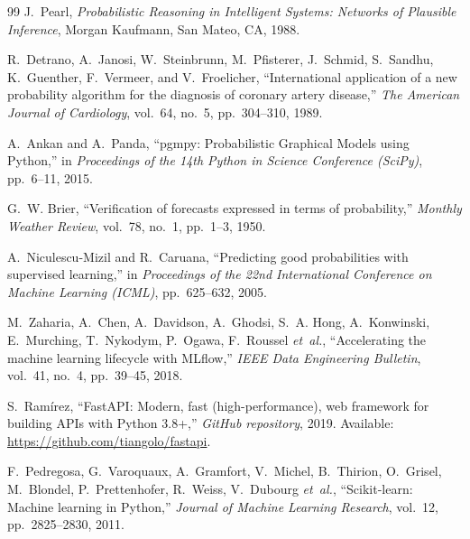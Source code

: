 \documentclass[12pt,a4paper]{report}
\begin{document}
\begin{thebibliography}{99}
J.~Pearl, \emph{Probabilistic Reasoning in Intelligent Systems: Networks of Plausible Inference}, Morgan Kaufmann, San Mateo, CA, 1988.

R.~Detrano, A.~Janosi, W.~Steinbrunn, M.~Pfisterer, J.~Schmid, S.~Sandhu, K.~Guenther, F.~Vermeer, and V.~Froelicher, ``International application of a new probability algorithm for the diagnosis of coronary artery disease,'' \emph{The American Journal of Cardiology}, vol.~64, no.~5, pp.~304--310, 1989.

A.~Ankan and A.~Panda, ``pgmpy: Probabilistic Graphical Models using Python,'' in \emph{Proceedings of the 14th Python in Science Conference (SciPy)}, pp.~6--11, 2015.

G.~W. Brier, ``Verification of forecasts expressed in terms of probability,'' \emph{Monthly Weather Review}, vol.~78, no.~1, pp.~1--3, 1950.

A.~Niculescu-Mizil and R.~Caruana, ``Predicting good probabilities with supervised learning,'' in \emph{Proceedings of the 22nd International Conference on Machine Learning (ICML)}, pp.~625--632, 2005.

M.~Zaharia, A.~Chen, A.~Davidson, A.~Ghodsi, S.~A. Hong, A.~Konwinski, E.~Murching, T.~Nykodym, P.~Ogawa, F.~Roussel \emph{et~al.}, ``Accelerating the machine learning lifecycle with MLflow,'' \emph{IEEE Data Engineering Bulletin}, vol.~41, no.~4, pp.~39--45, 2018.

S.~Ram\'irez, ``FastAPI: Modern, fast (high-performance), web framework for building APIs with Python 3.8+,'' \emph{GitHub repository}, 2019. Available: \url{https://github.com/tiangolo/fastapi}.

F.~Pedregosa, G.~Varoquaux, A.~Gramfort, V.~Michel, B.~Thirion, O.~Grisel, M.~Blondel, P.~Prettenhofer, R.~Weiss, V.~Dubourg \emph{et~al.}, ``Scikit-learn: Machine learning in Python,'' \emph{Journal of Machine Learning Research}, vol.~12, pp.~2825--2830, 2011.

\end{thebibliography}
\end{document}
